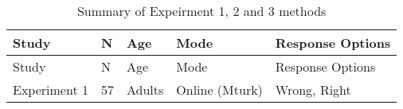 \documentclass[,man,floatsintext]{apa6}
\begin{document}
\begin{longtable}[]{@{}lllll@{}}
\caption{\label{tab:study1info}Summary of Expeirment 1, 2 and 3 methods}\tabularnewline
\toprule
\begin{minipage}[b]{0.16\columnwidth}\raggedright
Study\strut
\end{minipage} & \begin{minipage}[b]{0.01\columnwidth}\raggedright
N\strut
\end{minipage} & \begin{minipage}[b]{0.17\columnwidth}\raggedright
Age\strut
\end{minipage} & \begin{minipage}[b]{0.17\columnwidth}\raggedright
Mode\strut
\end{minipage} & \begin{minipage}[b]{0.34\columnwidth}\raggedright
Response Options\strut
\end{minipage}\tabularnewline
\midrule
\endfirsthead
\toprule
\begin{minipage}[b]{0.16\columnwidth}\raggedright
Study\strut
\end{minipage} & \begin{minipage}[b]{0.01\columnwidth}\raggedright
N\strut
\end{minipage} & \begin{minipage}[b]{0.17\columnwidth}\raggedright
Age\strut
\end{minipage} & \begin{minipage}[b]{0.17\columnwidth}\raggedright
Mode\strut
\end{minipage} & \begin{minipage}[b]{0.34\columnwidth}\raggedright
Response Options\strut
\end{minipage}\tabularnewline
\midrule
\endhead
\begin{minipage}[t]{0.16\columnwidth}\raggedright
Experiment 1\strut
\end{minipage} & \begin{minipage}[t]{0.01\columnwidth}\raggedright
57\strut
\end{minipage} & \begin{minipage}[t]{0.17\columnwidth}\raggedright
Adults\strut
\end{minipage} & \begin{minipage}[t]{0.17\columnwidth}\raggedright
Online (Mturk)\strut
\end{minipage} & \begin{minipage}[t]{0.34\columnwidth}\raggedright
Wrong, Right\strut

\end{minipage}
\end{longtable}
\end{document}
